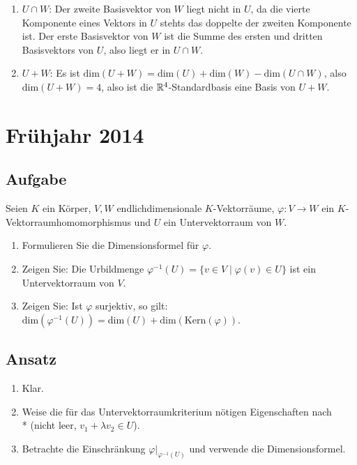 \begin{enumerate}
	 \item \( U \cap W \): Der zweite Basisvektor von \( W \) liegt nicht in \( U \), da die vierte Komponente eines Vektors in \( U \) stehts das doppelte der zweiten Komponente ist. Der erste Basisvektor von \( W \) ist die Summe des ersten und dritten Basisvektors von \( U \), also liegt er in \( U \cap W \).

	 \item \( U + W \): Es ist \( \text{dim}(U+W) = \text{dim}(U) + \text{dim}(W) - \text{dim}(U \cap W) \), also \( \text{dim}(U + W) = 4 \), also ist die \( \mathbb{R}^4 \)-Standardbasis eine Basis von \( U + W \).
\end{enumerate}

\newpage

\section{Frühjahr 2014}

\subsection{Aufgabe}
Seien \( K \) ein Körper, \( V, W \) endlichdimensionale \( K \)-Vektorräume, \( \varphi: V \to W \) ein \( K \)-Vektorraumhomomorphismus und \( U \) ein Untervektorraum von \( W \).
\begin{enumerate}
	\item Formulieren Sie die Dimensionsformel für \( \varphi \).
	\item Zeigen Sie: Die Urbildmenge \( \varphi^{-1}(U) = \{ v \in V \mid \varphi(v) \in U \} \) ist ein Untervektorraum von \( V \).
	\item Zeigen Sie: Ist \( \varphi \) surjektiv, so gilt: \( \text{dim}(\varphi^{-1}(U)) = \text{dim}(U) + \text{dim}(\text{Kern}(\varphi)) \).
\end{enumerate}

\subsection{Ansatz}
\begin{enumerate}
	\item Klar.
	\item Weise die für das Untervektorraumkriterium nötigen Eigenschaften nach \\* (nicht leer, \( v_1 + \lambda v_2 \in U \)).
	\item Betrachte die Einschränkung \( \varphi |_{\varphi^{-1}(U)} \) und verwende die Dimensionsformel. 
\end{enumerate}

